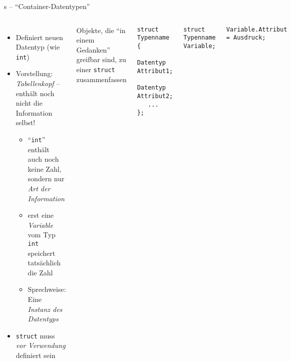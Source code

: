\begin{frame}[fragile]{s -- \enquote{Container-Datentypen}}
%
\vspace{-10pt}
\begin{columns}[b]
%
\small
\begin{itemize}
\item Definiert neuen Datentyp (wie \texttt{int})
\item Vorstellung: \emph{Tabellenkopf} -- enthält noch nicht die Information selbst!
	\begin{itemize}
	\item \enquote{\texttt{int}} enthält auch noch keine Zahl, sondern nur \emph{Art der
		Information}
	\item erst eine \emph{Variable} vom Typ \texttt{int} speichert tatsächlich die Zahl
	\item Sprechweise: Eine \emph{Instanz des Datentyps}
	\end{itemize}
\item \texttt{struct} muss \emph{vor Verwendung} definiert sein
\end{itemize}
\begin{hintbox}
\footnotesize Objekte, die \enquote{in einem Gedanken} greifbar sind, zu einer \texttt{struct} zusammenfassen
\end{hintbox}
%
\begin{codebox}
\begin{verbatim}
struct Typenname {
   Datentyp Attribut1;
   Datentyp Attribut2;
   ...
};
\end{verbatim}
\end{codebox}
%
\begin{codebox}
\begin{verbatim}
struct Typenname Variable;
\end{verbatim}
\end{codebox}
%
\begin{codebox}
\begin{verbatim}
Variable.Attribut = Ausdruck;
\end{verbatim}
\end{codebox}
\end{columns}
%

\end{frame}

